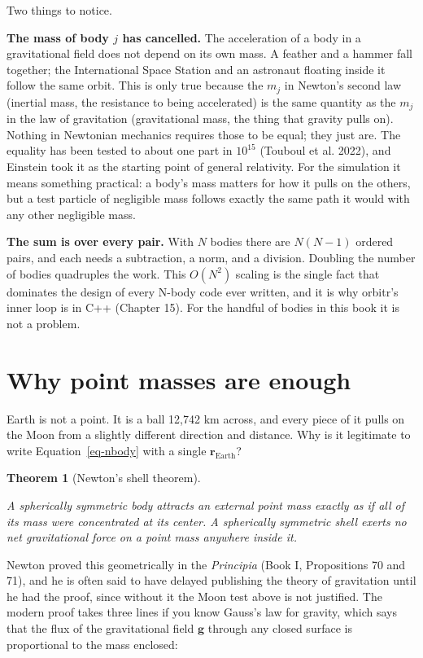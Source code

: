 \documentclass[
  10.5pt,
  letterpaper,
]{scrbook}
\theoremstyle{plain}
\newtheorem{theorem}{Theorem}[chapter]
\theoremstyle{remark}
\begin{document}
Two things to notice.

\textbf{The mass of body \(j\) has cancelled.} The acceleration of a
body in a gravitational field does not depend on its own mass. A feather
and a hammer fall together; the International Space Station and an
astronaut floating inside it follow the same orbit. This is only true
because the \(m_j\) in Newton's second law (inertial mass, the
resistance to being accelerated) is the same quantity as the \(m_j\) in
the law of gravitation (gravitational mass, the thing that gravity pulls
on). Nothing in Newtonian mechanics requires those to be equal; they
just are. The equality has been tested to about one part in \(10^{15}\)
({Touboul et al.} 2022), and Einstein took it as the starting point of
general relativity. For the simulation it means something practical: a
body's mass matters for how it pulls on the others, but a test particle
of negligible mass follows exactly the same path it would with any other
negligible mass.

\textbf{The sum is over every pair.} With \(N\) bodies there are
\(N(N-1)\) ordered pairs, and each needs a subtraction, a norm, and a
division. Doubling the number of bodies quadruples the work. This
\(O(N^2)\) scaling is the single fact that dominates the design of every
N-body code ever written, and it is why orbitr's inner loop is in C++
(Chapter 15). For the handful of bodies in this book it is not a
problem.

\section{Why point masses are enough}\label{why-point-masses-are-enough}

Earth is not a point. It is a ball 12,742 km across, and every piece of
it pulls on the Moon from a slightly different direction and distance.
Why is it legitimate to write Equation~\ref{eq-nbody} with a single
\(\mathbf{r}_{\mathrm{Earth}}\)?

\begin{theorem}[Newton's shell
theorem]\protect\hypertarget{thm-shell}{}\label{thm-shell}

A spherically symmetric body attracts an external point mass exactly as
if all of its mass were concentrated at its center. A spherically
symmetric shell exerts no net gravitational force on a point mass
anywhere inside it.

\end{theorem}

Newton proved this geometrically in the \emph{Principia} (Book I,
Propositions 70 and 71), and he is often said to have delayed publishing
the theory of gravitation until he had the proof, since without it the
Moon test above is not justified. The modern proof takes three lines if
you know Gauss's law for gravity, which says that the flux of the
gravitational field \(\mathbf{g}\) through any closed surface is
proportional to the mass enclosed:
\end{document}
